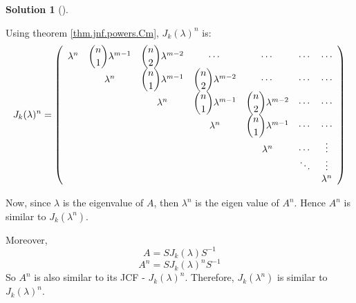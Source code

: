 \documentclass[numbers=enddot,12pt,final,onecolumn,notitlepage]{scrartcl}
\newcounter{sol}
\theoremstyle{definition}
\newtheorem{solu}[sol]{Solution}
\newenvironment{solution}[1][]
{\begin{solu}[#1]\begin{leftbar}}
        {\end{leftbar}\end{solu}}
\begin{document}
\begin{solution}
	Using theorem \ref{thm.jnf.powers.Cm}, $J_k(\lambda)^n$ is:
	\[
		J_k(\lambda)^n = \left(
		\begin{array}
				[c]{ccccccc}%
				\lambda^{n} & \dbinom{n}{1}\lambda^{m-1} & \dbinom{n}{2}\lambda^{m-2} & \cdots
				            & \cdots                     & \cdots                     & \cdots                                                                         \\
				            & \lambda^{n}                & \dbinom{n}{1}\lambda^{m-1} & \dbinom{n}{2}\lambda^{m-2} &
				\cdots      & \cdots                     & \cdots                                                                                                      \\
				            &                            & \lambda^{n}                & \dbinom{n}{1}\lambda^{m-1} & \dbinom{n}{2}\lambda^{m-2} &
				\cdots      & \cdots                                                                                                                                   \\
				            &                            &                            & \lambda^{n}                & \dbinom{n}{1}\lambda^{m-1} & \cdots & \cdots      \\
				            &                            &                            &                            & \lambda^{n}                & \cdots & \vdots      \\
				            &                            &                            &                            &                            & \ddots & \vdots      \\
				            &                            &                            &                            &                            &        & \lambda^{n}
			\end{array}
		\right)
	\]

	Now, since $\lambda$ is the eigenvalue of $A$, then $\lambda^n$ is the eigen value of $A^n$. Hence $A^n$ is similar to $J_k(\lambda^n)$.

	Moreover,
	\[
		A = SJ_k(\lambda)S^{-1}
	\]
	\[
		A^n = SJ_k(\lambda)^nS^{-1}
	\]
	So $A^n$ is also similar to its JCF - $J_k(\lambda)^n$. Therefore, $J_k(\lambda^n)$ is similar to $J_k(\lambda)^n$.


\end{solution}
\end{document}
